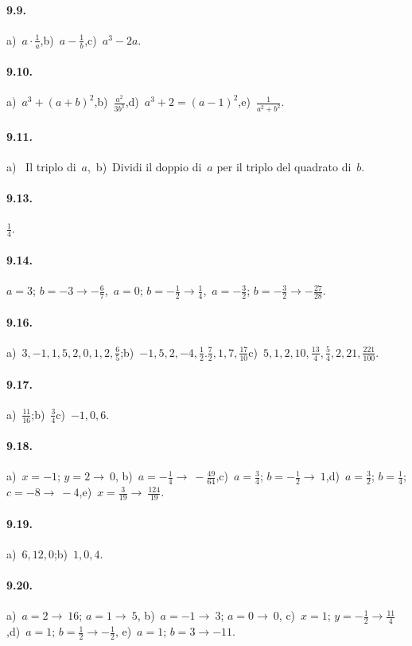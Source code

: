 \paragraph{9.9.}
a)~$a \cdot\frac{1}{a}$,\quad b)~$a-\frac{1}{b}$,\quad c)~$a^3-2a$.
\paragraph{9.10.}
a)~$a^3+(a+b)^2$,\quad b)~$\frac{a^2}{3b^3}$,\quad d)~$a^3+2=(a-1)^2$,\quad e)~$\frac{1}{a^2+b^2}$.
\paragraph{9.11.}
a)~ Il triplo di~$a$,\quad ~b)~Dividi il doppio di~$a$ per il triplo del quadrato di~$b$.
\paragraph{9.13.}
$\frac{1}{4}$.
\paragraph{9.14.} $a=3$; $b=-3\rightarrow -\frac{6}{7}$,\quad~$a=0$; $b=-\frac{1}{2}\rightarrow \frac{1}{4}$,\quad~$a=-\frac{3}{2}$; $b=-\frac{3}{2}\rightarrow -\frac{27}{28}$.
\paragraph{9.16.} a)~$3, -1, 1, 5, 2, 0, 1, 2, \frac{6}{5}$;\quad b)~$-1, 5, 2, -4, \frac{1}{2}.  \frac{7}{2}, 1, 7,\frac{17}{10}$\quad c)~$5, 1, 2, 10, \frac{13}{4}, \frac{5}{4}, 2, 21, \frac{221}{100}$. 
\paragraph{9.17.} a)~$\frac{11}{16}$;\quad b)~$\frac{3}{4}$\quad c)~$-1, 0, 6$. 
\paragraph{9.18.}
a)~$x=-1$; $y=2 \rightarrow~0$,
b)~$a=-\frac{1}{4} \rightarrow~-\frac{49}{64}$,\quad c)~$a=\frac{3}{4}$; $b=-\frac{1}{2} \rightarrow~1$,\quad d)~$a=\frac{3}{2}$; $b=\frac{1}{4}$; $c=-8 \rightarrow~-4$,\quad e)~$x=\frac{3}{19} \rightarrow~\frac{124}{19}$.
\paragraph{9.19.} a)~$6, 12, 0$;\quad b)~$1, 0, 4$. 
\paragraph{9.20.}
a)~$a=2 \rightarrow~16$; $a=1 \rightarrow~5$, \quad b)~$a=-1 \rightarrow~3$; $a=0 \rightarrow~0$,
c)~$x=1$; $y=-\frac{1}{2} \rightarrow \frac{11}{4}$,\quad d)~$a=1$; $b=\frac{1}{2}\rightarrow -\frac{1}{2}$, \quad e)~$a=1$; $b=3 \rightarrow -11$.
